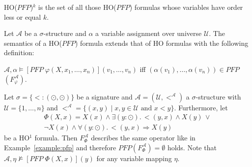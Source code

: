 HO($\mathit{PFP}$)$^k$ is the set of all those HO($\mathit{PFP}$) formulas whose variables have order less or equal $k$.

\begin{definition}
    Let $\mathcal{A}$ be a $\sigma$-structure and $\alpha$ a variable assignment over universe $\mathcal{U}$. The
    semantics of a HO($\mathit{PFP}$) formula extends that of HO formulas with the following definition:
    \begin{compactitem}
        \item $\mathcal{A}, \alpha \models [\mathit{PFP}\;\varphi(X, x_1, \dots, x_n)](v_1, \dots,
        v_n)$ iff $(\alpha(v_1), \dots, \alpha(v_n)) \in \mathit{PFP}$ $(F_\varphi^\mathcal{A})$.
    \end{compactitem}
\end{definition}

\begin{example}
\label{example:ho_pfp}
Let $\sigma = \{ < : (\odot, \odot) \}$ be a signature and $\mathcal{A} = (\mathcal{U}, <^\mathcal{A})$ a $\sigma$-structure with $\mathcal{U} = \{1, \dots, n\}$ and $<^\mathcal{A} = \{(x, y) \mid x, y \in \mathcal{U} \text{ and } x < y\}$. Furthermore, let
\begin{align*}
	\Phi(X,x) = X(x) \wedge \exists (y \colon \odot).\, <(y, x) \wedge X(y)\,\vee \\ 
	\neg X(x) \wedge \forall (y \colon \odot).\, <(y, x) \Rightarrow X(y)
\end{align*}
be a HO$^1$ formula. Then $F_\Phi^\mathcal{A}$ describes the same operator like in Example~\ref{example:pfp} and therefore $PFP(F_\Phi^\mathcal{A}) = \emptyset$ holds. Note that $\mathcal{A}, \eta \not\models [PFP\; \Phi(X, x)](y)$ for any variable mapping $\eta$.
\end{example}